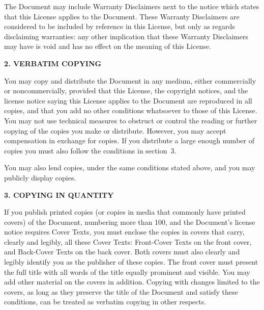 \documentclass[11pt]{book}
\numberwithin{example}{chapter}
\begin{document}
The Document may include Warranty Disclaimers next to the notice which
states that this License applies to the Document.  These Warranty
Disclaimers are considered to be included by reference in this
License, but only as regards disclaiming warranties: any other
implication that these Warranty Disclaimers may have is void and has
no effect on the meaning of this License.


\begin{center}
{\Large\bf 2. VERBATIM COPYING\par}

\end{center}

You may copy and distribute the Document in any medium, either
commercially or noncommercially, provided that this License, the
copyright notices, and the license notice saying this License applies
to the Document are reproduced in all copies, and that you add no other
conditions whatsoever to those of this License.  You may not use
technical measures to obstruct or control the reading or further
copying of the copies you make or distribute.  However, you may accept
compensation in exchange for copies.  If you distribute a large enough
number of copies you must also follow the conditions in section~3.

You may also lend copies, under the same conditions stated above, and
you may publicly display copies.


\begin{center}
{\Large\bf 3. COPYING IN QUANTITY\par}

\end{center}


If you publish printed copies (or copies in media that commonly have
printed covers) of the Document, numbering more than 100, and the
Document's license notice requires Cover Texts, you must enclose the
copies in covers that carry, clearly and legibly, all these Cover
Texts: Front-Cover Texts on the front cover, and Back-Cover Texts on
the back cover.  Both covers must also clearly and legibly identify
you as the publisher of these copies.  The front cover must present
the full title with all words of the title equally prominent and
visible.  You may add other material on the covers in addition.
Copying with changes limited to the covers, as long as they preserve
the title of the Document and satisfy these conditions, can be treated
as verbatim copying in other respects.
\end{document}
